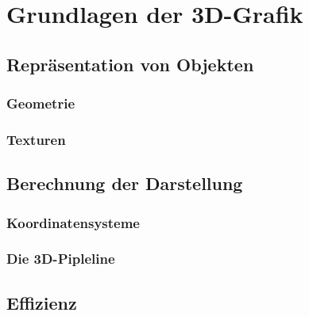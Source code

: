 \chapter{Grundlagen der 3D-Grafik}

\section{Repräsentation von Objekten}
\subsection{Geometrie}
\subsection{Texturen}
\label{texturing}

\section{Berechnung der Darstellung}
\subsection{Koordinatensysteme}
\subsection{Die 3D-Pipleline}
\label{direct3dopengl}

\section{Effizienz}
\label{performance}